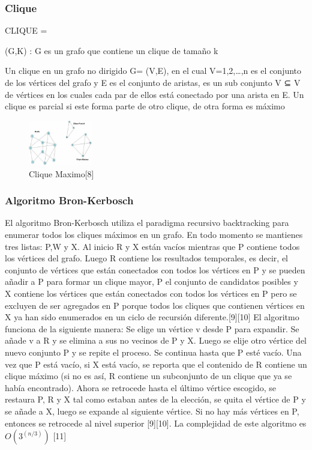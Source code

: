 \documentclass[conference,compsoc]{IEEEtran}
\begin{document}
\subsubsection{Clique}
CLIQUE = {(G,K) : G es un grafo que contiene un clique  de tamaño k

Un clique en un grafo no dirigido G= (V,E), en el cual V={1,2,…,n} es el conjunto de los vértices del grafo y E es el conjunto de aristas, es un sub conjunto V ⊆ V de vértices en los cuales cada par de ellos está conectado por una arista en E. Un clique es parcial si este forma parte de otro clique, de otra forma es máximo
\begin{figure}[h]
    \centering
    \includegraphics[width=0.25\textwidth]{Problema3/M5.png}
    \caption{Clique Maximo[8]}
    \label{fig:mesh1}
\end{figure}

\subsubsection{Algoritmo Bron-Kerbosch}
El algoritmo Bron-Kerbosch utiliza el paradigma recursivo backtracking para enumerar todos los cliques máximos en un grafo. En todo momento se mantienes tres listas: P,W y X. Al inicio R y X están vacíos mientras que P contiene todos los vértices del grafo. Luego R contiene los resultados temporales, es decir, el conjunto de vértices que están conectados con todos los vértices en P y se pueden añadir a P para formar un clique mayor, P el conjunto de candidatos posibles y  X contiene los vértices que están conectados con todos los vértices en P pero se excluyen de ser agregados en P porque todos los cliques que contienen vértices en X ya han sido enumerados en un ciclo de recursión diferente.[9][10]
El algoritmo funciona de la siguiente manera:
Se elige un vértice v desde P para expandir. Se añade v a R y se elimina a sus no vecinos de P y X. Luego se elije otro vértice del nuevo conjunto P y se repite el proceso. Se continua hasta que P esté vacío. Una vez que P está vacío, si X está vacío, se reporta que el contenido de R contiene un clique máximo (si no es así, R contiene un subconjunto de un clique que ya se había encontrado). Ahora se retrocede hasta el último vértice escogido, se restaura P, R y X tal como estaban antes de la elección, se quita el vértice de P y se añade a X, luego se expande al siguiente vértice. Si no hay más vértices en P, entonces se retrocede al nivel superior [9][10]. La complejidad de este algoritmo es $O(3^{(n/3)})$ [11]


}
\end{document}
